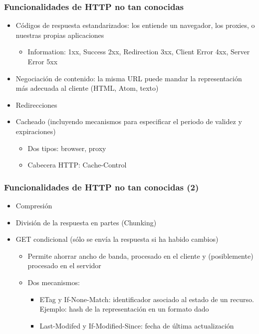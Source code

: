 \begin{frame}
\frametitle{Funcionalidades de HTTP no tan conocidas}

\begin{itemize}
\item Códigos de respuesta estandarizados: los entiende un navegador, los proxies, o nuestras propias aplicaciones
  \begin{itemize}
  \item Information: 1xx, Success 2xx, Redirection 3xx, Client Error 4xx, Server Error 5xx
  \end{itemize}
\item Negociación de contenido: la misma URL puede mandar la representación más adecuada al cliente (HTML, Atom, texto)
\item Redirecciones
\item Cacheado (incluyendo mecanismos para especificar el periodo de validez y expiraciones)
  \begin{itemize}
  \item Dos tipos: browser, proxy
  \item Cabecera HTTP: Cache-Control
  \end{itemize}
\end{itemize}

\end{frame}

\begin{frame}
\frametitle{Funcionalidades de HTTP no tan conocidas (2)}

\begin{itemize}
\item Compresión
\item División de la respuesta en partes (Chunking)
\item GET condicional (sólo se envía la respuesta si ha habido cambios)
  \begin{itemize}
  \item Permite ahorrar ancho de banda, procesado en el cliente y (posiblemente) procesado en el servidor
  \item Dos mecanismos:
    \begin{itemize}
    \item ETag y If-None-Match: identificador asociado al estado de un recurso. Ejemplo: hash de la representación en un formato dado
    \item Last-Modifed y If-Modified-Since: fecha de última actualización
    \end{itemize}
  \end{itemize}
\end{itemize}

\end{frame}


